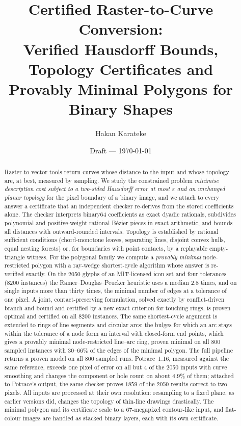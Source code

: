 \documentclass[11pt,a4paper]{article}
\title{Certified Raster-to-Curve Conversion:\\
Verified Hausdorff Bounds, Topology Certificates and\\
Provably Minimal Polygons for Binary Shapes}
\author{Hakan Karateke}
\date{Draft --- \today}
\theoremstyle{definition}
\theoremstyle{remark}
\begin{document}
\maketitle

\begin{abstract}
Raster-to-vector tools return curves whose distance to the input and whose
topology are, at best, measured by sampling. We study the constrained problem
\emph{minimise description cost subject to a two-sided Hausdorff error at most
$\varepsilon$ and an unchanged planar topology} for the pixel boundary of a
binary image, and we attach to every answer a certificate that an independent
checker re-derives from the stored coefficients alone. The checker interprets
binary64 coefficients as exact dyadic rationals, subdivides polynomial and
positive-weight rational B\'ezier pieces in exact arithmetic, and bounds all
distances with outward-rounded intervals. Topology is established by rational
sufficient conditions (chord-monotone leaves, separating lines, disjoint convex
hulls, equal nesting forests) or, for boundaries with point contacts, by a
replayable empty-triangle witness. For the polygonal family we compute a
\emph{provably minimal} node-restricted polygon with a ray-wedge shortest-cycle
algorithm whose answer is re-verified exactly. On the 2050 glyphs of an
MIT-licensed icon set and four tolerances (8200 instances) the
Ramer--Douglas--Peucker heuristic uses a median $2.8$ times, and on single
inputs more than thirty times, the minimal number of edges at a tolerance of
one pixel. A joint,
contact-preserving formulation, solved exactly by conflict-driven branch and
bound and certified by a new exact criterion for touching rings, is proven
optimal and certified on all 8200 instances. The same shortest-cycle
argument is extended to rings of line segments and circular arcs: the bulges
for which an arc stays within the tolerance of a node form an interval with
closed-form end points, which gives a provably minimal node-restricted
line--arc ring, proven minimal on all 800 sampled instances with $30$--$66\%$
of the edges of the minimal polygon. The full pipeline returns a proven model
on all 800 sampled runs. Potrace~1.16, measured against the same reference,
exceeds one pixel of error on all but 4 of the 2050 inputs with curve
smoothing and changes the component or hole count on about $4.9\%$ of them;
attached to Potrace's output, the same checker proves $1859$ of the 2050
results correct to two pixels. All inputs are processed at their own
resolution: resampling to a fixed plane, as earlier versions did, changes the
topology of thin-line drawings drastically. The minimal polygon and its
certificate scale to a $67$-megapixel contour-like input, and flat-colour
images are handled as stacked binary layers, each with its own certificate.
\end{abstract}
\end{document}
